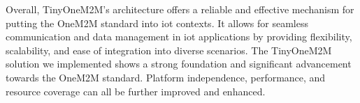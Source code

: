 \documentclass[a4paper,fleqn]{cas-dc}
\begin{document}
Overall, TinyOneM2M's architecture offers a reliable and effective mechanism for putting the OneM2M standard into \gls{iot} contexts. It allows for seamless communication and data management in \gls{iot} applications by providing flexibility, scalability, and ease of integration into diverse scenarios. The TinyOneM2M solution we implemented shows a strong foundation and significant advancement towards the OneM2M standard. Platform independence, performance, and resource coverage can all be further improved and enhanced.

%
%



\end{document}
